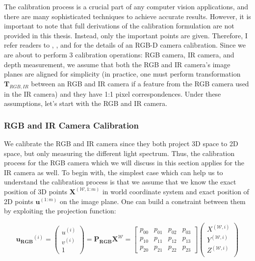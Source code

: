 \documentclass[a4paper]{report}
\numberwithin{figure}{section}
\begin{document}
The calibration process is a crucial part of any computer vision applications, 
and there are many sophisticated techniques to achieve accurate results.  
However, 
it is important to note that full derivations of the calibration formulation 
are not provided in this thesis. Instead, only the important points are 
given.  
Therefore, I refer readers to \parencite{Zhang2000a}, \parencite{Smisek2011}, 
\parencite{Karan2015} and \parencite{Herrera2016a} for the details of an RGB-D 
camera 
calibration.  Since we are about to perform 3 calibration operations: RGB 
camera, IR camera, and depth measurement, we assume that both the RGB and IR 
camera's image planes are aligned for simplicity (in practice, one must 
  perform transformation $\mathbf{T}_{RGB,IR}$ between an RGB 
and IR camera if a feature from the RGB camera used in the IR camera) and they 
have 
1:1 pixel correspondences. Under these assumptions, let's start with the RGB 
and 
IR camera.

\subsubsection{RGB and IR Camera Calibration}

We calibrate the RGB and IR camera since they both project 3D space to 2D 
space, 
but only measuring the different light spectrum. Thus, the calibration process 
for the RGB camera which we will discuss in this section applies for the IR 
camera as well.  To 
begin with, the simplest case which can help us to understand the calibration 
process is that we assume that we know the exact position of 3D points 
$\mathbf{X}^{(\mathcal{W}, 1:m)}$ in 
world coordinate system and exact position of 2D points $\mathbf{u}^{(1:m)}$ 
on 
the image plane.  
One can build a constraint between them by exploiting the projection function:

\begin{equation}
  \mathbf{u_{RGB}}^{(i)} = 
  \begin{pmatrix}
    u^{(i)}\\
    v^{(i)}\\
    1
  \end{pmatrix}
  =
  \mathbf{P_{RGB}}\mathbf{X^{\mathcal{W}}} = 
  \begin{bmatrix}
    p_{00} & p_{01} & p_{02} & p_{03}\\
    p_{10} & p_{11} & p_{12} & p_{13}\\
    p_{20} & p_{21} & p_{22} & p_{23}
  \end{bmatrix}
  \begin{pmatrix}
    X^{(\mathcal{W}, i)}\\
    Y^{(\mathcal{W}, i)}\\
    Z^{(\mathcal{W}, i)}\\
  \end{pmatrix}\label{eq:proj_matrix}
\end{equation} 
\end{document}
